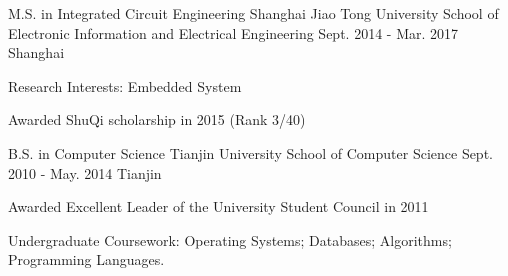 \begin{cventries}
  \cventry
    {M.S. in Integrated Circuit Engineering}
    {Shanghai Jiao Tong University \quad School of Electronic Information and Electrical Engineering}
    {Sept. 2014 - Mar. 2017}
    {Shanghai}
    {
      \begin{cvitems}
        \item {Research Interests: Embedded System}
        \item {Awarded ShuQi scholarship in 2015 (Rank 3/40)}
      \end{cvitems}
    }
    \cventry
    {B.S. in Computer Science}
    {Tianjin University \quad School of Computer Science}
    {Sept. 2010 - May. 2014}
    {Tianjin}
    {
      \begin{cvitems}
        \item {Awarded Excellent Leader of the University Student Council in 2011}
        \item {Undergraduate Coursework: Operating Systems; Databases; Algorithms; Programming Languages.}
      \end{cvitems}
    }
\end{cventries}
